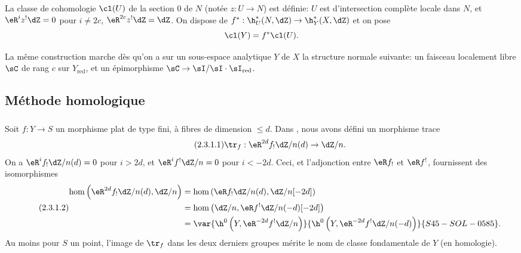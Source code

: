 La classe de cohomologie $\cl(U)$ de la section $0$ de $N$ (notée $z:U\to N$) 
est définie: $U$ est d'intersection complète locale dans $N$, et 
$\eR^i z^!\dZ = 0$ pour $i\ne 2 c$, $\eR^{2 c} z^!\dZ = \dZ$. On dispose de 
$f^*:\h_U^*(N,\dZ) \to \h_Y^*(X,\dZ)$ et on pose 
\[
  \cl(Y) = f^*\cl(U) \text{.}
\]

La même construction marche dès qu'on a sur un sous-espace analytique $Y$ 
de $X$ la structure normale suivante: un faisceau localement libre $\sC$ de 
rang $c$ sur $Y_\text{red}$, et un épimorphisme 
$\sC\to \sI/\sI\cdot \sI_\text{red}$. 










\subsection{Méthode homologique}\label{IV:2-3}





\subsubsection{}\label{IV:2-3-1}

Soit $f:Y\to S$ un morphisme plat de type fini, à fibres de dimension 
$\leqslant d$. Dans \cite[XVIII 2.9]{sga4}, nous avons défini un morphisme 
trace 
\begin{equation*}\tag{2.3.1.1}\label{IV:eq:2-3-1-1}
  \tr_f:\eR^{2 d} f_! \dZ/n(d) \to \dZ/n \text{.}
\end{equation*}
On a $\eR^i f_!\dZ/n(d)=0$ pour $i>2 d$, et $\eR^i f^!\dZ/n=0$ pour $i<-2 d$. 
Ceci, et l'adjonction entre $\eR f_!$ et $\eR f^!$, fournissent des isomorphismes 
\begin{equation*}\tag{2.3.1.2}\label{IV:eq:2-3-1-2}
\begin{aligned}
  \hom\left(\eR^{2 d}f_!\dZ/n(d),\dZ/n\right) 
    &= \hom\left(\eR f_!\dZ/n(d),\dZ/n[-2 d]\right) \\
    &= \hom\left(\dZ/n,\eR f^!\dZ/n(-d)[-2 d]\right) \\
    &= \var{\h^0\left(Y,\eR^{-2 d}f^!\dZ/n\right)}{\h^0\left(Y,\eR^{-2 d}f^!\dZ/n(-d)\right)}{S45-SOL-0585} \text{.}
\end{aligned}
\end{equation*}
Au moins pour $S$ un point, l'image de $\tr_f$ dans les deux derniers groupes 
mérite le nom de classe fondamentale de $Y$ (en homologie). 

